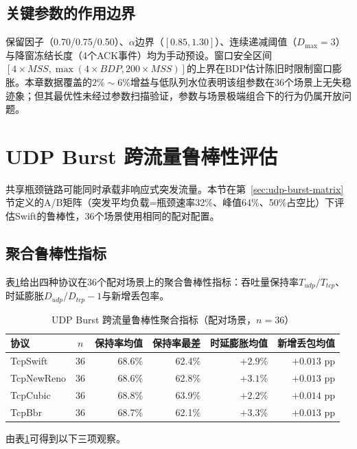\subsection{关键参数的作用边界}

保留因子（0.70/0.75/0.50）、$\alpha$边界（$[0.85,1.30]$）、连续递减阈值（$D_{\max}=3$）与降窗冻结长度（4个ACK事件）均为手动预设。窗口安全区间$[4\times MSS, \max(4\times BDP, 200\times MSS)]$的上界在BDP估计陈旧时限制窗口膨胀。本章数据覆盖的$2\%\sim6\%$增益与低队列水位表明该组参数在36个场景上无失稳迹象；但其最优性未经过参数扫描验证，参数与场景极端组合下的行为仍属开放问题。

\section{UDP Burst 跨流量鲁棒性评估}
\label{sec:udp-burst-robustness}

共享瓶颈链路可能同时承载非响应式突发流量。本节在第~\ref{sec:udp-burst-matrix}节定义的A/B矩阵（突发平均负载=瓶颈速率32\%、峰值64\%、50\%占空比）下评估Swift的鲁棒性，36个场景使用相同的配对配置。

\subsection{聚合鲁棒性指标}

表\ref{tab:udp-burst-agg}给出四种协议在36个配对场景上的聚合鲁棒性指标：吞吐量保持率$T_{udp}/T_{tcp}$、时延膨胀$D_{udp}/D_{tcp}-1$与新增丢包率。

\begin{table}[htbp]
\centering
\caption{UDP Burst 跨流量鲁棒性聚合指标（配对场景，$n=36$）}
\label{tab:udp-burst-agg}
\small
\begin{tabular}{|l|c|r|r|r|r|}
\hline
\textbf{协议} & \textbf{$n$} & \textbf{保持率均值} & \textbf{保持率最差} & \textbf{时延膨胀均值} & \textbf{新增丢包均值} \\
\hline
TcpSwift    & 36 & 68.6\% & 62.4\% & $+2.9$\% & $+0.013$ pp \\
TcpNewReno  & 36 & 68.6\% & 62.8\% & $+3.1$\% & $+0.013$ pp \\
TcpCubic    & 36 & 68.8\% & 63.9\% & $+2.2$\% & $+0.014$ pp \\
TcpBbr      & 36 & 68.7\% & 62.1\% & $+3.3$\% & $+0.013$ pp \\
\hline
\end{tabular}
\end{table}

由表\ref{tab:udp-burst-agg}可得到以下三项观察。

